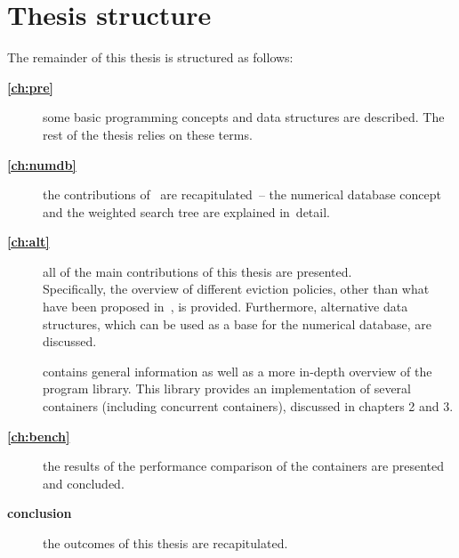 \section{Thesis structure}
The remainder of this thesis is structured as follows:
 \begin{description}
 \item[ \textbf{\cref{ch:pre}}] some basic programming concepts and data structures are described. The rest of the thesis relies on these terms.
 \item[ \textbf{\cref{ch:numdb}}] the contributions of~\cite{park90} are recapitulated~-- the numerical database concept and the weighted search tree are explained in~detail.
 \item[ \textbf{\cref{ch:alt}}] all of the main contributions of this thesis are presented. \\ Specifically, the overview of different eviction policies, other than what have been proposed in~\cite{park90}, is provided. Furthermore, alternative data structures, which can be used as a base for the numerical database, are discussed.

 \item [] contains general information as well as a more in-depth overview of the \numdbname{} program library. This library provides an implementation of several containers (including concurrent containers), discussed in chapters 2 and 3.

 \item [ \textbf{\cref{ch:bench}}] the results of the performance comparison of the containers are presented and concluded.

 \item [ \textbf{conclusion}] the outcomes of this thesis are recapitulated.

\end{description}
